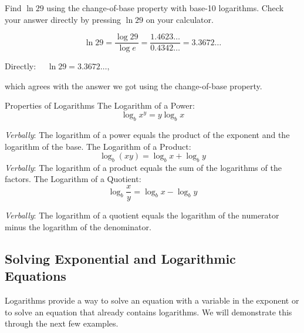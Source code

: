 \begin{example}
Find $\ln 29$ using the change-of-base property with base-10 logarithms. Check your answer directly by pressing $\ln 29$ on your calculator.

\begin{solution}

\[
\ln 29=\frac{\log 29}{\log e}=\frac{1.4623 \ldots}{0.4342 \ldots}=3.3672 \ldots
\]

\hspace{0.9cm} Directly: $\quad \ln 29=3.3672 \ldots,$

which agrees with the answer we got using the change-of-base property.
\end{solution}
\end{example}

\begin{custombox}{Properties of Logarithms}
\setlength{\leftskip}{1cm}  %
\setlength{\rightskip}{1cm} %
The Logarithm of a Power:
$$
\log _b x^y=y \log _b x
$$

\textit{Verbally}: The logarithm of a power equals the product of the exponent and the logarithm of the base.
\vspace{0.5cm}
The Logarithm of a Product:
$$
\log _b(x y)=\log _b x+\log _b y
$$
\textit{Verbally}: The logarithm of a product equals the sum of the logarithms of the factors.
\vspace{0.5cm}
The Logarithm of a Quotient:
$$
\log _b \frac{x}{y}=\log _b x-\log _b y
$$

\textit{Verbally}: The logarithm of a quotient equals the logarithm of the numerator minus the logarithm of the denominator.

\setlength{\leftskip}{0cm}  %
\setlength{\rightskip}{0cm} %

\end{custombox}

\subsection*{Solving Exponential and Logarithmic Equations}
Logarithms provide a way to solve an equation with a variable in the exponent or to solve an equation that already contains logarithms. We will demonstrate this through the next few examples.

